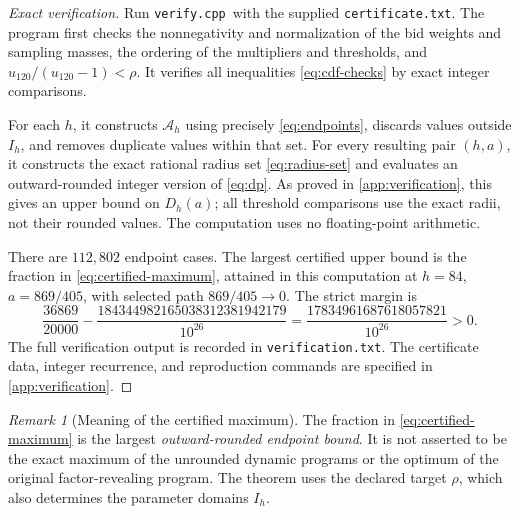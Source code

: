 \documentclass[11pt]{article}
\theoremstyle{definition}
\theoremstyle{remark}
\newtheorem{remark}[theorem]{Remark}
\newcommand{\paramset}{\mathcal A}
\newcommand{\verifier}{\nolinkurl{verify.cpp}}
\begin{document}
\begin{proof}[Exact verification]
Run \verifier\ with the supplied \texttt{certificate.txt}. The program
first checks the nonnegativity and normalization of the bid weights and
sampling masses, the ordering of the multipliers and thresholds, and
$u_{120}/(u_{120}-1)<\rho$. It verifies all inequalities
\eqref{eq:cdf-checks} by exact integer comparisons.

For each $h$, it constructs $\paramset_h$ using precisely
\eqref{eq:endpoints}, discards values outside $I_h$, and removes duplicate
values within that set. For every resulting pair $(h,a)$, it constructs the
exact rational radius set \eqref{eq:radius-set} and evaluates an
outward-rounded integer version of \eqref{eq:dp}. As proved in
\cref{app:verification}, this gives an upper bound on $D_h(a)$; all
threshold comparisons use the exact radii, not their rounded values.
The computation uses no floating-point arithmetic.

There are $112{,}802$ endpoint cases. The largest certified upper bound is
the fraction in \eqref{eq:certified-maximum}, attained in this computation
at $h=84$, $a=869/405$, with selected path $869/405\longrightarrow0$.
The strict margin is
\begin{equation}\label{eq:margin}
  \frac{36869}{20000}
  -\frac{184344982165038312381942179}{10^{26}}
  =\frac{17834961687618057821}{10^{26}}>0.
\end{equation}
The full verification output is recorded in \texttt{verification.txt}.
The certificate data, integer recurrence, and reproduction commands are
specified in \cref{app:verification}.
\end{proof}

\begin{remark}[Meaning of the certified maximum]
The fraction in \eqref{eq:certified-maximum} is the largest
\emph{outward-rounded endpoint bound}. It is not asserted to be the exact
maximum of the unrounded dynamic programs or the optimum of the original
factor-revealing program. The theorem uses the declared target $\rho$,
which also determines the parameter domains $I_h$.
\end{remark}
\end{document}

